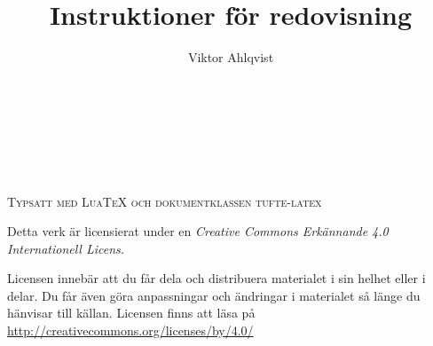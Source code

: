 \documentclass[%
	a4paper,
	twoside,
	titlepage,
	swedish,
	]{scrbook}
\title{Instruktioner för redovisning}
\author{Viktor Ahlqvist}
\begin{document}
\frontmatter

\makeatletter
\begin{titlepage}

	\raggedleft
	\vspace*{\baselineskip}
	{\scshape \@author \\[0.4\textheight]}
	{\Huge \@title \\[1.5\baselineskip]}

\end{titlepage}
\makeatother

\newpage
~\vfill
\thispagestyle{empty}


\par\textsc{Typsatt med LuaTeX och dokumentklassen tufte-latex}

\par Detta verk är licensierat under en \emph{Creative Commons Erkännande 4.0 Internationell Licens.}

Licensen innebär att du får dela och distribuera materialet i sin helhet eller i delar. Du får även göra anpassningar och ändringar i materialet så länge du hänvisar till källan. Licensen finns att läsa på \url{http://creativecommons.org/licenses/by/4.0/} 




\end{document}
